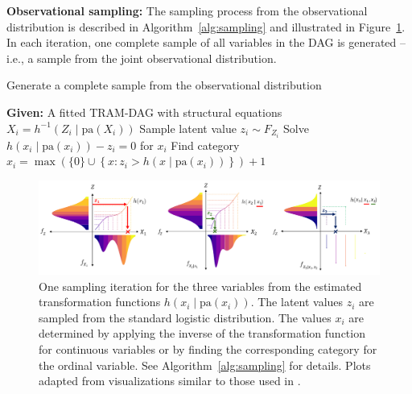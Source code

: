 \medskip

\textbf{Observational sampling:} The sampling process from the observational distribution is described in Algorithm~\ref{alg:sampling} and illustrated in Figure~\ref{fig:sampling}. In each iteration, one complete sample of all variables in the DAG is generated -- i.e., a sample from the joint observational distribution.

\begin{algorithm}
\caption{Generate a complete sample from the observational distribution}
\label{alg:sampling}
\begin{algorithmic}
\State \textbf{Given:} A fitted TRAM-DAG with structural equations $X_i = h^{-1}(Z_i \mid \text{pa}(X_i))$
  \State Sample latent value $z_i \sim F_{Z_i}$ 
    \State Solve $h(x_i \mid \text{pa}(x_i)) - z_i = 0$ for $x_i$ 
    \State Find category $x_i = \max \left( \{0\} \cup \left\{ x : z_i > h(x \mid \text{pa}(x_i)) \right\} \right) + 1
$
  \EndIf
\EndFor
\end{algorithmic}
\end{algorithm}


\begin{figure}[H]  %
\centering
\includegraphics[width=1\textwidth]{img/sampling.png}
\caption{One sampling iteration for the three variables from the estimated transformation functions $h(x_i \mid \text{pa}(x_i))$. The latent values $z_i$ are sampled from the standard logistic distribution. The values $x_i$ are determined by applying the inverse of the transformation function for continuous variables or by finding the corresponding category for the ordinal variable. See Algorithm~\ref{alg:sampling} for details. Plots adapted from visualizations similar to those used in \citet{sick2025}.}
\label{fig:sampling}
\end{figure}


% 


